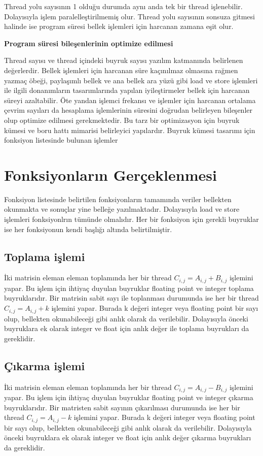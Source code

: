 Thread yolu sayısının 1 olduğu durumda aynı anda tek bir thread işlenebilir. Dolayısıyla işlem paralelleştirilmemiş olur. Thread yolu sayısının sonsuza gitmesi halinde ise program süresi bellek işlemleri için harcanan zamana eşit olur. \par
\textbf{Program süresi bileşenlerinin optimize edilmesi}\par
Thread sayısı ve thread içindeki buyruk sayısı yazılım katmanında belirlenen değerlerdir. Bellek işlemleri için harcanan süre kaçınılmaz olmasına rağmen yazmaç öbeği, paylaşımlı bellek ve ana bellek ara yüzü gibi load ve store işlemleri ile ilgili donanımların tasarımlarında yapılan iyileştirmeler bellek için harcanan süreyi azaltabilir. Öte yandan işlemci frekansı ve işlemler için harcanan ortalama çevrim sayıları da hesaplama işlemlerinin süresini doğrudan belirleyen bileşenler olup optimize edilmesi gerekmektedir. Bu tarz bir optimizasyon için buyruk kümesi ve boru hattı mimarisi belirleyici yapılardır. Buyruk kümesi tasarımı için fonksiyon listesinde bulunan işlemler \par 

\section{Fonksiyonların Gerçeklenmesi} \label{fonksiyonlarinGerceklenmesi}
Fonksiyon listesinde belirtilen fonksiyonların tamamında veriler bellekten okunmakta ve sonuçlar yine belleğe yazılmaktadır. Dolayısıyla load ve store işlemleri fonksiyonlrın tümünde olmalıdır. Her bir fonksiyon için gerekli buyruklar ise her fonksiyonun kendi başlığı altında belirtilmiştir.

\subsection{Toplama işlemi}
İki matrisin eleman eleman toplamında her bir thread $C_{i,j} = A_{i,j} + B_{i,j}$ işlemini yapar. Bu işlem için ihtiyaç duyulan buyruklar floating point ve integer toplama buyruklarıdır. Bir matrisin sabit sayı ile toplanması durumunda ise her bir thread $C_{i,j} = A_{i,j} + k$ işlemini yapar. Burada k değeri integer veya floating point bir sayı olup, bellekten okunabileceği gibi anlık olarak da verilebilir. Dolayısıyla önceki buyruklara ek olarak integer ve float için anlık değer ile toplama buyrukları da gereklidir.

\subsection{Çıkarma işlemi}
İki matrisin eleman eleman toplamında her bir thread $C_{i,j} = A_{i,j} - B_{i,j}$ işlemini yapar. Bu işlem için ihtiyaç duyulan buyruklar floating point ve integer çıkarma buyruklarıdır. Bir matristen sabit sayının çıkarılması durumunda ise her bir thread $C_{i,j} = A_{i,j} - k$ işlemini yapar. Burada k değeri integer veya floating point bir sayı olup, bellekten okunabileceği gibi anlık olarak da verilebilir. Dolayısıyla önceki buyruklara ek olarak integer ve float için anlık değer çıkarma buyrukları da gereklidir.

